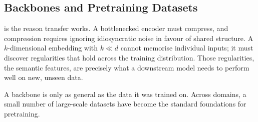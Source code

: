 \subsection{Backbones and Pretraining Datasets}


 is the reason transfer works.
A bottlenecked encoder must compress, and compression requires ignoring idiosyncratic noise in favour of shared structure.
A $k$-dimensional embedding with $k \ll d$ cannot memorise individual inputs; it must discover regularities that hold across the training distribution.
Those regularities, the semantic features, are precisely what a downstream model needs to perform well on new, unseen data.

A backbone is only as general as the data it was trained on.
Across domains, a small number of large-scale datasets have become the standard foundations for pretraining.

